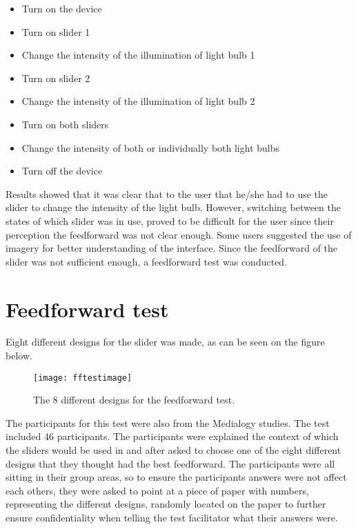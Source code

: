 \begin{itemize}
\item Turn on the device
\item Turn on slider 1
\item Change the intensity of the illumination of light bulb 1
\item Turn on slider 2
\item Change the intensity of the illumination of light bulb 2
\item Turn on both sliders
\item Change the intensity of both or individually both light bulbs
\item Turn off the device
\end{itemize}


Results showed that it was clear that to the user that he/she had to use the slider to change the intensity of the light bulb. However, switching between the states of which slider was in use, proved to be difficult for the user since their perception the feedforward was not clear enough. Some users suggested the use of imagery for better understanding of the interface.
Since the feedforward of the slider was not sufficient enough, a feedforward test was conducted.

\section{Feedforward test}
Eight different designs for the slider was made, as can be seen on the figure below.

\begin{figure}[!h] 
\centering
\texttt{[image: fftestimage]}
\caption{\label{fig:fftestimage} The 8 different designs for the feedforward test.}
\end{figure}

The participants for this test were also from the Medialogy studies. The test included 46 participants. The participants were explained the context of which the sliders would be used in and after asked to choose one of the eight different designs that they thought had the best feedforward. The participants were all sitting in their group areas, so to ensure the participants answers were not affect each others, they were asked to point at a piece of paper with numbers, representing the different designs, randomly located on the paper to further ensure confidentiality when telling the test facilitator what their answers were. 

